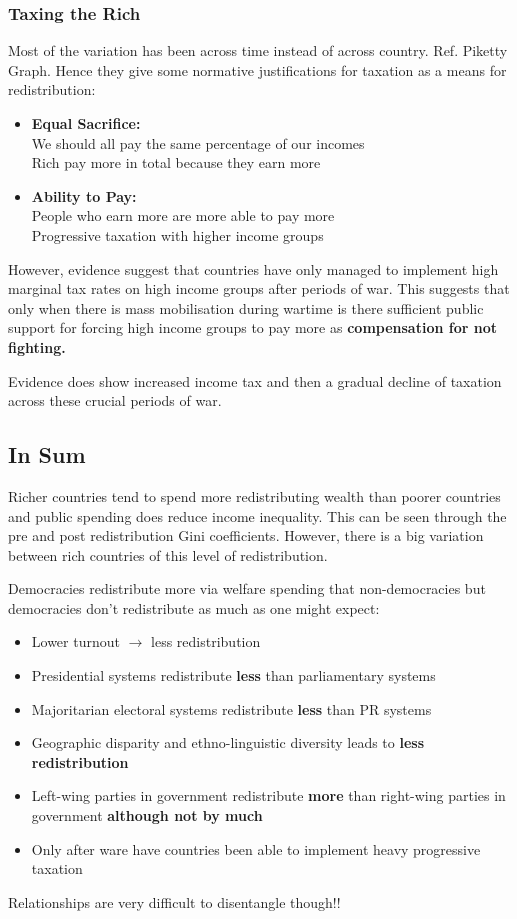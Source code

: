 \documentclass[12pt, letterpaper]{article}
\begin{document}
\subsubsection{Taxing the Rich}
Most of the variation has been across time instead of across country. Ref. Piketty Graph. Hence they give some normative justifications for taxation as a means for redistribution:
\begin{itemize}
	\item \textbf{Equal Sacrifice:}\\
		We should all pay the same percentage of our incomes\\
		Rich pay more in total because they earn more
	\item \textbf{Ability to Pay:}\\
		People who earn more are more able to pay more\\
		Progressive taxation with higher income groups
\end{itemize}
However, evidence suggest that countries have only managed to implement high marginal tax rates on high income groups after periods of war. This suggests that only when there is mass mobilisation during wartime is there sufficient public support for forcing high income groups to pay more as \textbf{compensation for not fighting.}

Evidence does show increased income tax and then a gradual decline of taxation across these crucial periods of war.

\subsection{In Sum}
Richer countries tend to spend more redistributing wealth than poorer countries and public spending does reduce income inequality. This can be seen through the pre and post redistribution Gini coefficients. However, there is a big variation between rich countries of this level of redistribution.

Democracies redistribute more via welfare spending that non-democracies but democracies don't redistribute as much as one might expect:
\begin{itemize}
	\item Lower turnout $\rightarrow$ less redistribution
	\item Presidential systems redistribute \textbf{less} than parliamentary systems
	\item Majoritarian electoral systems redistribute \textbf{less} than PR systems
	\item Geographic disparity and ethno-linguistic diversity leads to \textbf{less redistribution}
	\item Left-wing parties in government redistribute \textbf{more} than right-wing parties in government \textbf{although not by much}
	\item Only after ware have countries been able to implement heavy progressive taxation
\end{itemize}
Relationships are very difficult to disentangle though!!
\end{document}
